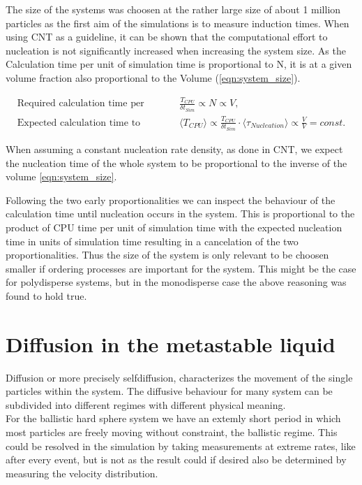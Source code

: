 The size of the systems was choosen at the rather large size of about 1 million particles as the first aim of the simulations is to measure induction times. When using CNT as a guideline, it can be shown that the computational effort to nucleation is not significantly increased when increasing the system size. As the Calculation time per unit of simulation time is proportional to N, it is at a given volume fraction also proportional to the Volume (\autoref{eqn:system_size}).

\begin{align}
\label{eqn:system_size}
&\text {Required calculation time per simulation time:  } & \frac{T_{CPU}}{\delta t_{Sim}} \propto N \propto V \text{,} \\
&\text {Expected calculation time to nucleation:   }  & \langle T_{CPU} \rangle \propto  \frac{T_{CPU}}{\delta t_{Sim}}  \cdot \langle \tau_{Nucleation} \rangle \propto \frac{V}{V} = const. &%
\end{align}

When assuming a constant nucleation rate density, as done in CNT, we expect the nucleation time of the whole system to be proportional to the inverse of the volume \autoref{eqn:system_size}.


Following the two early proportionalities we can inspect the behaviour of the calculation time until nucleation occurs in the system. This is proportional to the product of CPU time per unit of simulation time with the expected nucleation time in units of simulation time resulting in a cancelation of the two proportionalities. Thus the size of the system is only relevant to be choosen smaller if ordering processes are important for the system. This might be the case for polydisperse systems, but in the monodisperse case the above reasoning was found to hold true.\\



\section{Diffusion in the metastable liquid}
\label{sec:diffusion_metastable_liquid}
Diffusion or more precisely selfdiffusion, characterizes the movement of the single particles within the system. The diffusive behaviour for many system can be subdivided into different regimes with different physical meaning.\\ 

For the ballistic hard sphere system we have an extemly short period in which most particles are freely moving without constraint, the ballistic regime. This could be resolved in the simulation by taking measurements at extreme rates, like after every event, but is not as the result could if desired also be determined by measuring the velocity distribution.\\ 

